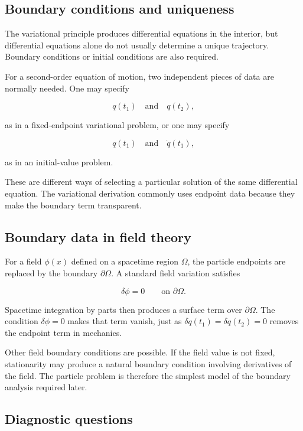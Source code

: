 \subsection{Boundary conditions and uniqueness}

The variational principle produces differential equations in the interior, but differential equations alone do not usually determine a unique trajectory. Boundary conditions or initial conditions are also required.

For a second-order equation of motion, two independent pieces of data are normally needed. One may specify

\[
q(t_{1})
\quad\text{and}\quad
q(t_{2}),
\]

as in a fixed-endpoint variational problem, or one may specify

\[
q(t_{1})
\quad\text{and}\quad
\dot q(t_{1}),
\]

as in an initial-value problem.

These are different ways of selecting a particular solution of the same differential equation. The variational derivation commonly uses endpoint data because they make the boundary term transparent.

\subsection{Boundary data in field theory}

For a field \(\phi(x)\) defined on a spacetime region \(\Omega\), the particle endpoints are replaced by the boundary \(\partial\Omega\). A standard field variation satisfies

\[
\delta\phi=0
\qquad\text{on }\partial\Omega.
\]

Spacetime integration by parts then produces a surface term over \(\partial\Omega\). The condition \(\delta\phi=0\) makes that term vanish, just as \(\delta q(t_{1})=\delta q(t_{2})=0\) removes the endpoint term in mechanics.

Other field boundary conditions are possible. If the field value is not fixed, stationarity may produce a natural boundary condition involving derivatives of the field. The particle problem is therefore the simplest model of the boundary analysis required later.

\subsection{Diagnostic questions}


